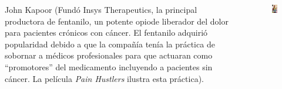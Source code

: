 \documentclass[aspectratio=169]{beamer}
\begin{document}
\begin{frame}
\begin{columns}
\begin{column}{0.5\textwidth}
John Kapoor (Fundó Insys Therapeutics, la principal productora de fentanilo, un potente opiode liberador del dolor para pacientes crónicos con cáncer. El fentanilo adquirió popularidad debido a que la compañía tenía la práctica de sobornar a médicos profesionales para que actuaran como ``promotores'' del medicamento incluyendo a pacientes sin cáncer. La película \textit{Pain Hustlers} ilustra esta práctica).\\
\end{column}
\begin{column}{0.5\textwidth}
\begin{figure}
\includegraphics[width=.5\textwidth]{Pain.png}
\end{figure}   
\end{column}
\end{columns}
\end{frame}
\end{document}
